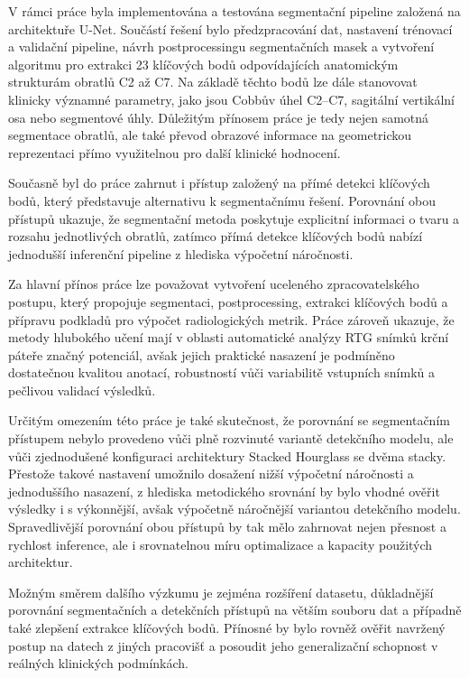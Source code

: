 \documentclass[male,czech,api_bc]{kitheses}
\begin{document}
V rámci práce byla implementována a testována segmentační pipeline založená na architektuře U-Net. Součástí řešení bylo předzpracování dat, nastavení trénovací a validační pipeline, návrh postprocessingu segmentačních masek a vytvoření algoritmu pro extrakci 23 klíčových bodů odpovídajících anatomickým strukturám obratlů C2 až C7. Na základě těchto bodů lze dále stanovovat klinicky významné parametry, jako jsou Cobbův úhel C2--C7, sagitální vertikální osa nebo segmentové úhly. Důležitým přínosem práce je tedy nejen samotná segmentace obratlů, ale také převod obrazové informace na geometrickou reprezentaci přímo využitelnou pro další klinické hodnocení.

Současně byl do práce zahrnut i přístup založený na přímé detekci klíčových bodů, který představuje alternativu k segmentačnímu řešení. Porovnání obou přístupů ukazuje, že segmentační metoda poskytuje explicitní informaci o tvaru a rozsahu jednotlivých obratlů, zatímco přímá detekce klíčových bodů nabízí jednodušší inferenční pipeline z hlediska výpočetní náročnosti.

Za hlavní přínos práce lze považovat vytvoření uceleného zpracovatelského postupu, který propojuje segmentaci, postprocessing, extrakci klíčových bodů a přípravu podkladů pro výpočet radiologických metrik. Práce zároveň ukazuje, že metody hlubokého učení mají v oblasti automatické analýzy RTG snímků krční páteře značný potenciál, avšak jejich praktické nasazení je podmíněno dostatečnou kvalitou anotací, robustností vůči variabilitě vstupních snímků a pečlivou validací výsledků.

Určitým omezením této práce je také skutečnost, že porovnání se segmentačním přístupem nebylo provedeno vůči plně rozvinuté variantě detekčního modelu, ale vůči zjednodušené konfiguraci architektury Stacked Hourglass se dvěma stacky. Přestože takové nastavení umožnilo dosažení nižší výpočetní náročnosti a jednoduššího nasazení, z hlediska metodického srovnání by bylo vhodné ověřit výsledky i s výkonnější, avšak výpočetně náročnější variantou detekčního modelu. Spravedlivější porovnání obou přístupů by tak mělo zahrnovat nejen přesnost a rychlost inference, ale i srovnatelnou míru optimalizace a kapacity použitých architektur.

Možným směrem dalšího výzkumu je zejména rozšíření datasetu, důkladnější porovnání segmentačních a detekčních přístupů na větším souboru dat a případně také zlepšení extrakce klíčových bodů. Přínosné by bylo rovněž ověřit navržený postup na datech z jiných pracovišť a posoudit jeho generalizační schopnost v reálných klinických podmínkách.
\end{document}

